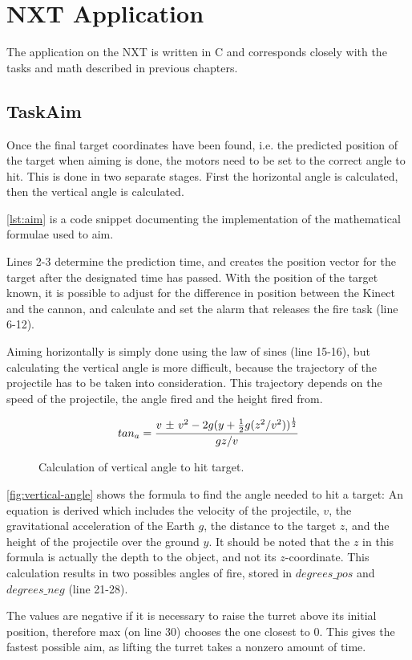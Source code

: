 \section{NXT Application}
The application on the NXT is written in C and corresponds closely with the tasks and math described in previous chapters.

\subsection{TaskAim}
Once the final target coordinates have been found, i.e. the predicted position of the target when aiming is done, the motors need to be set to the correct angle to hit. This is done in two separate stages. First the horizontal angle is calculated, then the vertical angle is calculated.

\autoref{lst:aim} is a code snippet documenting the implementation of the mathematical formulae used to aim.


Lines 2-3 determine the prediction time, and creates the position vector for the target after the designated
time has passed. With the position of the target known, it is possible to adjust for the difference in position 
between the Kinect and the cannon, and calculate and set the alarm that releases the fire task (line 6-12).

Aiming horizontally is simply done using the law of sines (line 15-16), but calculating the vertical angle is more difficult, because the trajectory of the projectile has to be taken into consideration. This trajectory depends on the speed of the projectile, the angle fired and the height fired from.

\begin{figure}[htbp]
$$tan_a = {v \text{ \textpm} \text{ } v^2 - 2g(y + {1 \over 2}g(z^2/v^2))^{1 \over 2} \over gz/v}$$
\caption{Calculation of vertical angle to hit target\cite{anglealgorithm}.}
\label{fig:vertical-angle}
\end{figure}

\autoref{fig:vertical-angle} shows the formula to find the angle needed to hit a target: An equation is derived which  
includes the velocity of the projectile, $v$, the gravitational acceleration of the Earth $g$, the distance to the
target $z$, and the height of the projectile over the ground $y$. It should be noted that the $z$ in this formula
is actually the depth to the object, and not its $z$-coordinate. This calculation results in two possibles angles
of fire, stored in $degrees\_pos$ and $degrees\_neg$ (line 21-28).

The values are negative if it is necessary to raise the turret above its initial position, therefore max (on line 30)
chooses the one closest to 0\textdegree . This gives the fastest possible aim, as lifting the turret takes a nonzero
amount of time.
